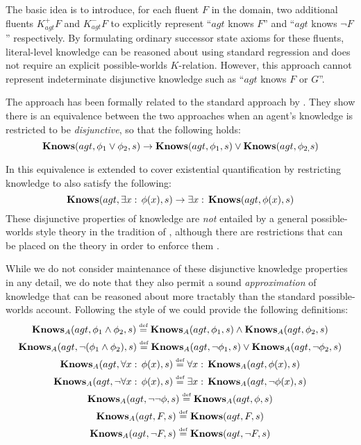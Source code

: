 The basic idea is to introduce, for each fluent $F$ in the domain,
two additional fluents $K_{agt}^{+}F$ and $K_{agt}^{-}F$ to explicitly
represent {}``$agt$ knows $F$'' and {}``$agt$ knows $\neg F$''
respectively. By formulating ordinary successor state axioms for these
fluents, literal-level knowledge can be reasoned about using standard
regression and does not require an explicit possible-worlds $K$-relation.
However, this approach cannot represent indeterminate disjunctive
knowledge such as {}``$agt$ knows $F$ or $G$''.

The \citeauthor{demolombe00tractable_sc_belief} approach has been
formally related to the standard \citeauthor{scherl03sc_knowledge}
approach by \citet{petrick02knowledge_equivalence}. They show there
is an equivalence between the two approaches when an agent's knowledge
is restricted to be \emph{disjunctive}, so that the following holds:\[
\mathbf{Knows}(agt,\phi_{1}\vee\phi_{2},s)\rightarrow\mathbf{Knows}(agt,\phi_{1},s)\vee\mathbf{Knows}(agt,\phi_{2,}s)\]


In \citep{Petrick06thesis} this equivalence is extended to cover
existential quantification by restricting knowledge to also satisfy
the following:\[
\mathbf{Knows}(agt,\exists x:\,\phi(x),s)\rightarrow\exists x:\,\mathbf{Knows}(agt,\phi(x),s)\]
 These disjunctive properties of knowledge are \emph{not} entailed
by a general possible-worlds style theory in the tradition of \citep{scherl03sc_knowledge},
although there are restrictions that can be placed on the theory in
order to enforce them \citep{petrick08cartesian_situations,Petrick06thesis}.

While we do not consider maintenance of these disjunctive knowledge
properties in any detail, we do note that they also permit a sound
\emph{approximation} of knowledge that can be reasoned about more
tractably than the standard possible-worlds account. Following the
style of \citep{petrick02knowledge_equivalence} we could provide
the following definitions:\begin{gather*}
\mathbf{Knows}_{A}(agt,\phi_{1}\wedge\phi_{2},s)\stackrel{\mbox{\tiny def}}{=}\mathbf{Knows}_{A}(agt,\phi_{1},s)\wedge\mathbf{Knows}_{A}(agt,\phi_{2},s)\\
\mathbf{Knows}_{A}(agt,\neg(\phi_{1}\wedge\phi_{2}),s)\stackrel{\mbox{\tiny def}}{=}\mathbf{Knows}_{A}(agt,\neg\phi_{1},s)\vee\mathbf{Knows}_{A}(agt,\neg\phi_{2},s)\\
\mathbf{Knows}_{A}(agt,\forall x:\,\phi(x),s)\stackrel{\mbox{\tiny def}}{=}\forall x:\,\mathbf{Knows}_{A}(agt,\phi(x),s)\\
\mathbf{Knows}_{A}(agt,\neg\forall x:\,\phi(x),s)\stackrel{\mbox{\tiny def}}{=}\exists x:\,\mathbf{Knows}_{A}(agt,\neg\phi(x),s)\\
\mathbf{Knows}_{A}(agt,\neg\neg\phi,s)\stackrel{\mbox{\tiny def}}{=}\mathbf{Knows}_{A}(agt,\phi,s)\\
\mathbf{Knows}_{A}(agt,F,s)\stackrel{\mbox{\tiny def}}{=}\mathbf{Knows}(agt,F,s)\\
\mathbf{Knows}_{A}(agt,\neg F,s)\stackrel{\mbox{\tiny def}}{=}\mathbf{Knows}(agt,\neg F,s)\end{gather*}


